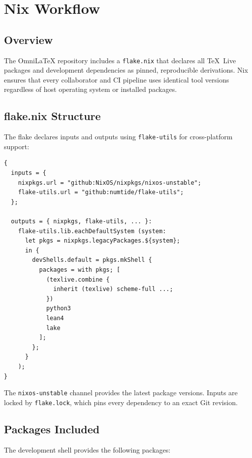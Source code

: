 \chapter{Nix Workflow}
\label{ch:nix-workflow}

\section{Overview}

The OmniLaTeX repository includes a \texttt{flake.nix} that declares all
TeX~Live packages and development dependencies as pinned, reproducible
derivations.  Nix ensures that every collaborator and CI pipeline uses
identical tool versions regardless of host operating system or installed
packages.

\section{flake.nix Structure}

The flake declares inputs and outputs using \texttt{flake-utils} for
cross-platform support:

\begin{verbatim}
{
  inputs = {
    nixpkgs.url = "github:NixOS/nixpkgs/nixos-unstable";
    flake-utils.url = "github:numtide/flake-utils";
  };

  outputs = { nixpkgs, flake-utils, ... }:
    flake-utils.lib.eachDefaultSystem (system:
      let pkgs = nixpkgs.legacyPackages.${system};
      in {
        devShells.default = pkgs.mkShell {
          packages = with pkgs; [
            (texlive.combine {
              inherit (texlive) scheme-full ...;
            })
            python3
            lean4
            lake
          ];
        };
      }
    );
}
\end{verbatim}

The \texttt{nixos-unstable} channel provides the latest package versions.
Inputs are locked by \texttt{flake.lock}, which pins every dependency to
an exact Git revision.

\section{Packages Included}

The development shell provides the following packages:

